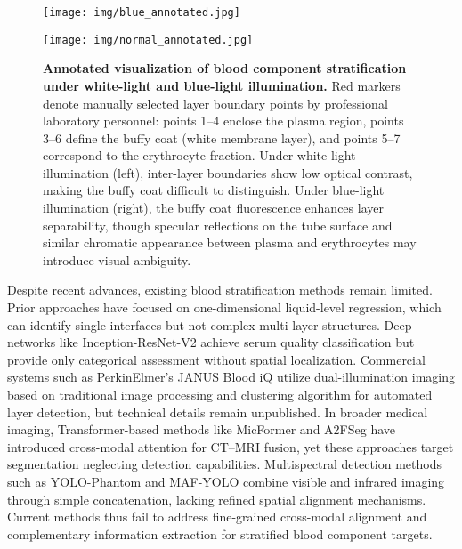 \documentclass[journal,twoside,web]{ieeecolor}
\begin{document}
\begin{figure}[!t]
\centering

\newlength{\sepM}\setlength{\sepM}{10pt}      %
\newlength{\colw}\setlength{\colw}{0.45\linewidth} %
\newlength{\imgheight}

\begin{minipage}[t]{\colw}
  \centering
  \texttt{[image: img/blue\_annotated.jpg]}%
  \\
  \vspace{3pt}
\end{minipage}
\begin{minipage}[t]{\colw}
  \centering
  \texttt{[image: img/normal\_annotated.jpg]}\\
  \vspace{3pt}
\end{minipage}

\vspace{5pt}
\caption{\textbf{Annotated visualization of blood component stratification under white-light and blue-light illumination.}
Red markers denote manually selected layer boundary points by professional laboratory personnel: points 1–4 enclose the plasma region, points 3–6 define the buffy coat (white membrane layer), and points 5–7 correspond to the erythrocyte fraction. 
Under white-light illumination (left), inter-layer boundaries show low optical contrast, making the buffy coat difficult to distinguish. 
Under blue-light illumination (right), the buffy coat fluorescence enhances layer separability, though specular reflections on the tube surface and similar chromatic appearance between plasma and erythrocytes may introduce visual ambiguity.}
\label{fig:annotated images}
\end{figure}

Despite recent advances, existing blood stratification methods remain limited. Prior approaches have focused on one-dimensional liquid-level regression, which can identify single interfaces but not complex multi-layer structures. Deep networks like Inception-ResNet-V2 achieve serum quality classification but provide only categorical assessment without spatial localization. Commercial systems such as PerkinElmer's JANUS Blood iQ utilize dual-illumination imaging based on traditional image processing and clustering algorithm for automated layer detection, but technical details remain unpublished. In broader medical imaging, Transformer-based methods like MicFormer and A2FSeg have introduced cross-modal attention for CT–MRI fusion, yet these approaches target segmentation neglecting detection capabilities. Multispectral detection methods such as YOLO-Phantom and MAF-YOLO combine visible and infrared imaging through simple concatenation, lacking refined spatial alignment mechanisms. Current methods thus fail to address fine-grained cross-modal alignment and complementary information extraction for stratified blood component targets.
\end{document}
